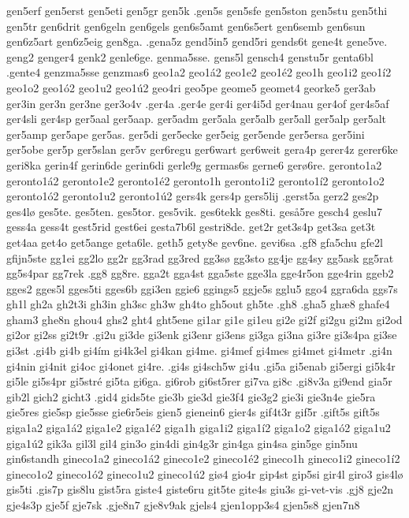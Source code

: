 gen5erf
gen5erst
gen5eti
gen5gr
gen5k
.gen5s
gen5sfe
gen5ston
gen5stu
gen5thi
gen5tr
gen6drit
gen6geln
gen6gels
gen6s5amt
gen6s5ert
gen6semb
gen6sun
gen6z5art
gen6z5eig
gen8ga.
.gena5z
gend5in5
gend5ri
gends6t
gene4t
gene5ve.
geng2
genger4
genk2
genle6ge.
genma5sse.
gens5l
gensch4
genstu5r
genta6bl
.gente4
genzma5sse
genzmas6
geo1a2
geo1á2
geo1e2
geo1é2
geo1h
geo1i2
geo1í2
geo1o2
geo1ó2
geo1u2
geo1ú2
geo4ri
geo5pe
geome5
geomet4
georke5
ger3ab
ger3in
ger3n
ger3ne
ger3o4v
.ger4a
.ger4e
ger4i
ger4i5d
ger4nau
ger4of
ger4s5af
ger4sli
ger4sp
ger5aal
ger5aap.
ger5adm
ger5ala
ger5alb
ger5all
ger5alp
ger5alt
ger5amp
ger5ape
ger5as.
ger5di
ger5ecke
ger5eig
ger5ende
ger5ersa
ger5ini
ger5obe
ger5p
ger5slan
ger5v
ger6regu
ger6wart
ger6weit
gera4p
gerer4z
gerer6ke
geri8ka
gerin4f
gerin6de
gerin6di
gerle9g
germas6s
gerne6
gerø6re.
geronto1a2
geronto1á2
geronto1e2
geronto1é2
geronto1h
geronto1i2
geronto1í2
geronto1o2
geronto1ó2
geronto1u2
geronto1ú2
gers4k
gers4p
gers5lij
.gerst5a
gerz2
ges2p
ges4lø
ges5te.
ges5ten.
ges5tor.
ges5vik.
ges6tekk
ges8ti.
geså5re
gesch4
geslu7
gess4a
gess4t
gest5rid
gest6ei
gesta7b6l
gestri8de.
get2r
get3s4p
get3sa
get3t
get4aa
get4o
get5ange
geta6le.
geth5
gety8e
gev6ne.
gevi6sa
.gf8
gfa5chu
gfe2l
gfijn5ste
gg1ei
gg2lo
gg2r
gg3rad
gg3red
gg3sø
gg3sto
gg4je
gg4sy
gg5ask
gg5rat
gg5s4par
gg7rek
.gg8
gg8re.
gga2t
gga4st
gga5ste
gge3la
gge4r5on
gge4rin
ggeb2
gges2
gges5l
gges5ti
gges6b
ggi3en
ggie6
ggings5
ggje5s
gglu5
ggo4
ggra6da
ggs7s
gh1l
gh2a
gh2t3i
gh3in
gh3sc
gh3w
gh4to
gh5out
gh5te
.gh8
.gha5
ghæ8
ghafe4
gham3
ghe8n
ghou4
ghs2
ght4
ght5ene
gi1ar
gi1e
gi1eu
gi2e
gi2f
gi2gu
gi2m
gi2od
gi2or
gi2ss
gi2t9r
.gi2u
gi3de
gi3enk
gi3enr
gi3ens
gi3ga
gi3na
gi3re
gi3s4pa
gi3se
gi3st
.gi4b
gi4b
gi4ím
gi4k3el
gi4kan
gi4me.
gi4mef
gi4mes
gi4met
gi4metr
.gi4n
gi4nin
gi4nit
gi4oc
gi4onet
gi4re.
.gi4s
gi4sch5w
gi4u
.gi5a
gi5enab
gi5ergi
gi5k4r
gi5le
gi5s4pr
gi5stré
gi5ta
gi6ga.
gi6rob
gi6st5rer
gi7va
gi8c
.gi8v3a
gi9end
gia5r
gib2l
gich2
gicht3
.gid4
gids5te
gie3b
gie3d
gie3f4
gie3g2
gie3i
gie3n4e
gie5ra
gie5res
gie5sp
gie5sse
gie6r5eis
gien5
gienein6
gier4s
gif4t3r
gif5r
.gift5s
gift5s
giga1a2
giga1á2
giga1e2
giga1é2
giga1h
giga1i2
giga1í2
giga1o2
giga1ó2
giga1u2
giga1ú2
gik3a
gil3l
gil4
gin3o
gin4di
gin4g3r
gin4ga
gin4sa
gin5ge
gin5nu
gin6standh
gineco1a2
gineco1á2
gineco1e2
gineco1é2
gineco1h
gineco1i2
gineco1í2
gineco1o2
gineco1ó2
gineco1u2
gineco1ú2
giø4
gio4r
gip4st
gip5si
gir4l
giro3
gis4lø
gis5ti
.gis7p
gis8lu
gist5ra
giste4
giste6ru
git5te
gite4s
giu3s
gi-vet-vis
.gj8
gje2n
gje4s3p
gje5f
gje7sk
.gje8n7
gje8v9ak
gjels4
gjen1opp3s4
gjen5s8
gjen7n8
